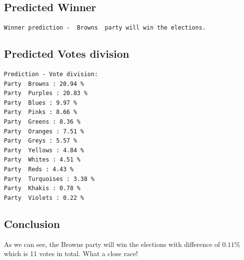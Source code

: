 \documentclass[12pt]{article}
\begin{document}
\subsection{Predicted Winner}
\begin{verbatim}
Winner prediction -  Browns  party will win the elections.
\end{verbatim}

\subsection{Predicted Votes division}
\begin{verbatim}
Prediction - Vote division:
Party  Browns : 20.94 %
Party  Purples : 20.83 %
Party  Blues : 9.97 %
Party  Pinks : 8.66 %
Party  Greens : 8.36 %
Party  Oranges : 7.51 %
Party  Greys : 5.57 %
Party  Yellows : 4.84 %
Party  Whites : 4.51 %
Party  Reds : 4.43 %
Party  Turquoises : 3.38 %
Party  Khakis : 0.78 %
Party  Violets : 0.22 %
\end{verbatim}

\subsection{Conclusion}
As we can see, the Browns party will win the elections with difference of $0.11\%$ which is 11 votes in total. What a close race! 
\end{document}
